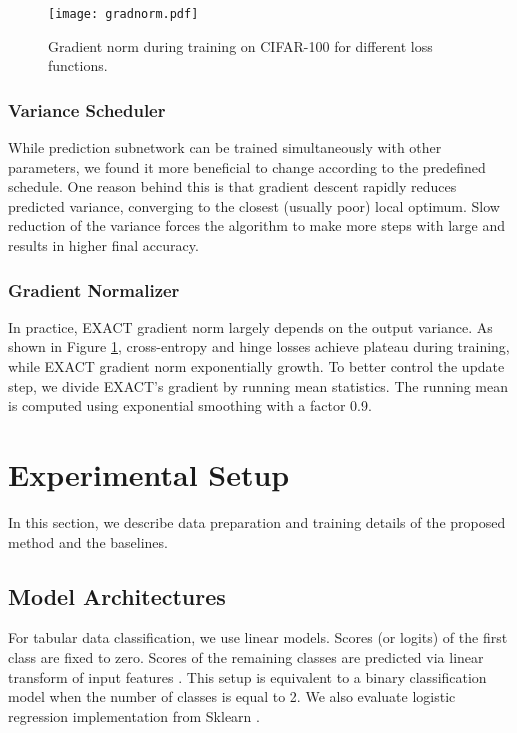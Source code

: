\documentclass[nohyperref]{article}
\theoremstyle{plain}
\theoremstyle{definition}
\theoremstyle{remark}
\begin{document}
\begin{figure}[t]
\vskip 0.0in
\centering
\texttt{[image: gradnorm.pdf]}
\caption{Gradient norm during training on CIFAR-100 for different loss functions.}
\label{fig:gradnorm}
\vskip -0.2in
\end{figure}

\subsubsection{Variance Scheduler}
While  prediction subnetwork can be trained simultaneously with other parameters, we found it more beneficial to change  according to the predefined schedule. One reason behind this is that gradient descent rapidly reduces predicted variance, converging to the closest (usually poor) local optimum. Slow reduction of the variance forces the algorithm to make more steps with large  and results in higher final accuracy.

\subsubsection{Gradient Normalizer}
In practice, EXACT gradient norm largely depends on the output variance. As shown in Figure \ref{fig:gradnorm}, cross-entropy and hinge losses achieve plateau during training, while EXACT gradient norm exponentially growth. To better control the update step, we divide EXACT's gradient by running mean statistics. The running mean is computed using exponential smoothing with a factor 0.9.







\section{Experimental Setup}
In this section, we describe data preparation and training details of the proposed method and the baselines.

\subsection{Model Architectures}
For tabular data classification, we use linear models. Scores (or logits) of the first class are fixed to zero. Scores of the remaining classes are predicted via linear transform \mbox{} of input features . This setup is equivalent to a binary classification model when the number of classes is equal to 2. We also evaluate logistic regression implementation from Sklearn \cite{scikit-learn}.
\end{document}
